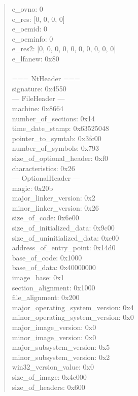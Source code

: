 \documentclass[12pt,a4paper,dvipdfmx]{jsarticle}
\begin{document}
\begin{quote}
e\_ovno:		0 \\
e\_res:		[0, 0, 0, 0] \\
e\_oemid:	0 \\
e\_oeminfo:	0 \\
e\_res2:		[0, 0, 0, 0, 0, 0, 0, 0, 0, 0] \\
e\_lfanew:	0x80 \\
 \\
=== NtHeader === \\
signature: 0x4550 \\
--- FileHeader --- \\
machine:	0x8664 \\
number\_of\_sections:	0x14 \\
time\_date\_stamp:	0x63525048 \\
pointer\_to\_symtab:	0x3fc00 \\
number\_of\_symbols:	0x793 \\
size\_of\_optional\_header:	0xf0 \\
characteristics:	0x26 \\
--- OptionalHeader --- \\
magic:	0x20b \\
major\_linker\_version:	0x2 \\
minor\_linker\_version:	0x26 \\
size\_of\_code:	0x6e00 \\
size\_of\_initialized\_data:	0x9c00 \\
size\_of\_uninitialized\_data:	0xc00 \\
address\_of\_entry\_point:	0x14d0 \\
base\_of\_code:	0x1000 \\
base\_of\_data:	0x40000000 \\
image\_base:	0x1 \\
section\_alignment:	0x1000 \\
file\_alignment:	0x200 \\
major\_operating\_system\_version:	0x4 \\
minor\_operating\_system\_version:	0x0 \\
major\_image\_version:	0x0 \\
minor\_image\_version:	0x0 \\
major\_subsystem\_version:	0x5 \\
minor\_subsystem\_version:	0x2 \\
win32\_version\_value:	0x0 \\
size\_of\_image:	0x4e000 \\
size\_of\_headers:	0x600 \\

\end{quote}
\end{document}
